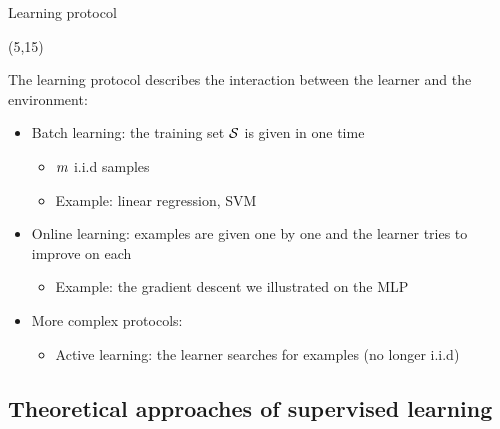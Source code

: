 \begin{frame}{Learning protocol}

  \begin{textblock}{90}(5,15)
    \begin{block}{}
      The learning protocol describes the interaction between the learner and the
      environment:
      \begin{itemize}
      \item<2-> Batch learning: the training set $\mathcal{S}$
        is given in one time
        \begin{itemize}
        \item $m$ i.i.d samples
        \item Example: linear regression, SVM
        \end{itemize}
      \item<3-> Online learning: examples are given one by one and the learner
        tries to improve on each
        \begin{itemize}
        \item<4-> Example: the gradient descent we illustrated on the \ac{MLP}
        \end{itemize}
      \item<5-> More complex protocols:
        \begin{itemize}
        \item Active learning: the learner searches for examples (no longer i.i.d)
        \end{itemize}
      \end{itemize}
    \end{block}
  \end{textblock}
\end{frame}

\subsection{Theoretical approaches of supervised learning}

